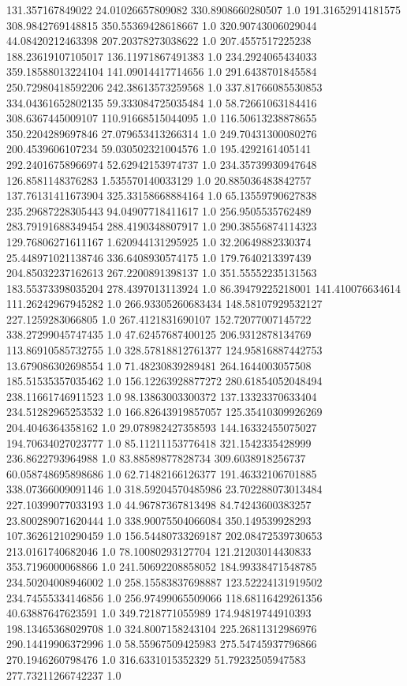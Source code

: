 131.357167849022	24.01026657809082	330.8908660280507	1.0
191.31652914181575	308.9842769148815	350.55369428618667	1.0
320.90743006029044	44.08420212463398	207.20378273038622	1.0
207.4557517225238	188.23619107105017	136.11971867491383	1.0
234.2924065434033	359.18588013224104	141.09014417714656	1.0
291.6438701845584	250.72980418592206	242.38613573259568	1.0
337.81766085530853	334.04361652802135	59.333084725035484	1.0
58.72661063184416	308.6367445009107	110.91668515044095	1.0
116.50613238878655	350.2204289697846	27.079653413266314	1.0
249.70431300080276	200.4539606107234	59.030502321004576	1.0
195.4292161405141	292.24016758966974	52.62942153974737	1.0
234.35739930947648	126.8581148376283	1.535570140033129	1.0
20.885036483842757	137.76131411673904	325.33158668884164	1.0
65.13559790627838	235.29687228305443	94.04907718411617	1.0
256.9505535762489	283.79191688349454	288.4190348807917	1.0
290.38556874114323	129.76806271611167	1.620944131295925	1.0
32.20649882330374	25.448971021138746	336.6408930574175	1.0
179.7640213397439	204.85032237162613	267.2200891398137	1.0
351.55552235131563	183.55373398035204	278.4397013113924	1.0
86.39479225218001	141.410076634614	111.26242967945282	1.0
266.93305260683434	148.58107929532127	227.1259283066805	1.0
267.4121831690107	152.72077007145722	338.27299045747435	1.0
47.62457687400125	206.9312878134769	113.86910585732755	1.0
328.57818812761377	124.95816887442753	13.679086302698554	1.0
71.48230839289481	264.1644003057508	185.51535357035462	1.0
156.12263928877272	280.61854052048494	238.11661746911523	1.0
98.13863003300372	137.13323370633404	234.51282965253532	1.0
166.82643919857057	125.35410309926269	204.4046364358162	1.0
29.078982427358593	144.16332455075027	194.70634027023777	1.0
85.11211153776418	321.1542335428999	236.8622793964988	1.0
83.88589877828734	309.6038918256737	60.058748695898686	1.0
62.71482166126377	191.46332106701885	338.07366009091146	1.0
318.59204570485986	23.702288073013484	227.10399077033193	1.0
44.96787367813498	84.74243600383257	23.800289071620444	1.0
338.90075504066084	350.149539928293	107.36261210290459	1.0
156.54480733269187	202.08472539730653	213.0161740682046	1.0
78.10080293127704	121.21203014430833	353.7196000068866	1.0
241.50692208858052	184.99338471548785	234.50204008946002	1.0
258.15583837698887	123.52224131919502	234.74555334146856	1.0
256.97499065509066	118.68116429261356	40.63887647623591	1.0
349.7218771055989	174.94819744910393	198.13465368029708	1.0
324.8007158243104	225.26811312986976	290.14419906372996	1.0
58.55967509425983	275.54745937796866	270.1946260798476	1.0
316.6331015352329	51.79232505947583	277.73211266742237	1.0
